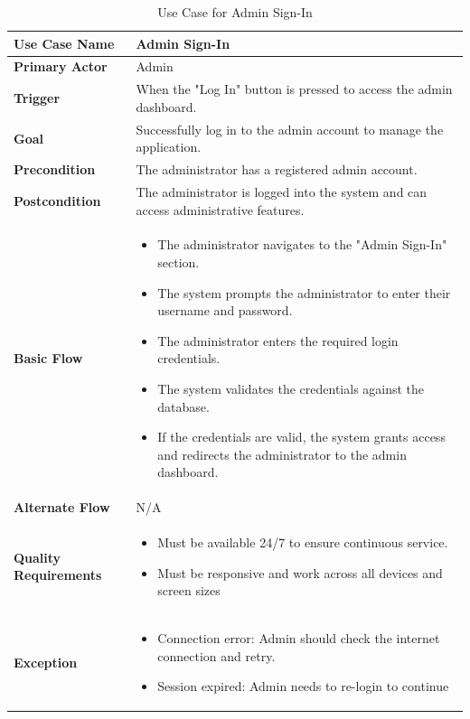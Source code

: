 \documentclass[12pt]{report}
\begin{document}
\vspace{10pt}

\begin{table}[h!]

\begin{tabular}{|p{3.5cm}|p{10cm}|}
\hline
\textbf{Use Case Name} & Admin Sign-In \\ 
\hline
\textbf{Primary Actor} & Admin \\ 
\hline
\textbf{Trigger} & When the "Log In" button is pressed to access the admin dashboard. \\ 
\hline
\textbf{Goal} & Successfully log in to the admin account to manage the application. \\ 
\hline
\textbf{Precondition} & The administrator has a registered admin account. \\ 
\hline
\textbf{Postcondition} & The administrator is logged into the system and can access administrative features. \\ 

\hline
\textbf{Basic Flow} & 
\begin{itemize}
    \item The administrator navigates to the "Admin Sign-In" section.
    \item The system prompts the administrator to enter their username and password.
    \item The administrator enters the required login credentials.
    \item The system validates the credentials against the database.
    \item If the credentials are valid, the system grants access and redirects the administrator to the admin dashboard.
\end{itemize} \\ 
\hline
\textbf{Alternate Flow} & N/A \\ 
\hline

\textbf{Quality Requirements} & 
\begin{itemize}
    \item Must be available 24/7 to ensure continuous service.
    \item Must be responsive and work across all devices and screen sizes
\end{itemize} \\ 
\hline
\textbf{Exception} & 
\begin{itemize}
    \item Connection error: Admin should check the internet connection and retry.
    \item Session expired: Admin needs to re-login to continue
\end{itemize} \\ 

\hline
\end{tabular}
\caption{Use Case for Admin Sign-In}
\end{table}
\end{document}
